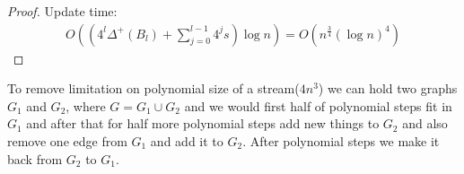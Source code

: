\begin{proof}
	Update time:
	\begin{align*}
		O\left(\left(4^{l} \Delta^+(B_l) + \sum_{j = 0}^{l - 1} 4^{j}s\right)\log n\right) = O\left(n^{\frac{3}{4}} (\log n)^{4}\right)
	\end{align*}


\end{proof}

\begin{remrk}
  To remove limitation on polynomial size of a stream($4n^3$) we can hold two graphs $G_1$ and $G_2$, where $G = G_1 \cup G_2$ and we would first half of polynomial steps fit in $G_1$ and after that for half more polynomial steps add new things to $G_2$ and also remove one edge from $G_1$ and add it to $G_2$. After polynomial steps we make it back from $G_2$ to $G_1$.
\end{remrk}


